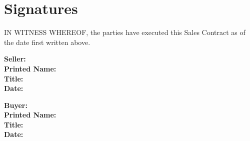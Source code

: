 \documentclass[12pt]{article}
\begin{document}
\section{Signatures}
IN WITNESS WHEREOF, the parties have executed this Sales Contract as of the date first written above.

\vspace{1cm}

\noindent
\textbf{Seller:} \underline{\hspace{7cm}}\\[0.5cm]
\textbf{Printed Name:} \underline{\hspace{7cm}}\\[0.5cm]
\textbf{Title:} \underline{\hspace{7cm}}\\[0.5cm]
\textbf{Date:} \underline{\hspace{7cm}}

\vspace{1cm}

\noindent
\textbf{Buyer:} \underline{\hspace{7cm}}\\[0.5cm]
\textbf{Printed Name:} \underline{\hspace{7cm}}\\[0.5cm]
\textbf{Title:} \underline{\hspace{7cm}}\\[0.5cm]
\textbf{Date:} \underline{\hspace{7cm}}
\end{document}
